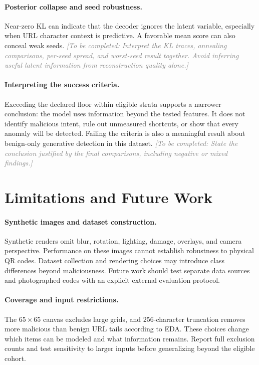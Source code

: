 \documentclass{article}
\newcommand{\pending}[1]{\textcolor{gray}{\textit{[To be completed: #1]}}}
\begin{document}
\paragraph{Posterior collapse and seed robustness.}
Near-zero KL can indicate that the decoder ignores the latent variable, especially when URL character context is predictive.
A favorable mean score can also conceal weak seeds.
\pending{Interpret the KL traces, annealing comparisons, per-seed spread, and worst-seed result together. Avoid inferring useful latent information from reconstruction quality alone.}

\paragraph{Interpreting the success criteria.}
Exceeding the declared floor within eligible strata supports a narrower conclusion: the model uses information beyond the tested features.
It does not identify malicious intent, rule out unmeasured shortcuts, or show that every anomaly will be detected.
Failing the criteria is also a meaningful result about benign-only generative detection in this dataset.
\pending{State the conclusion justified by the final comparisons, including negative or mixed findings.}

\section{Limitations and Future Work}

\paragraph{Synthetic images and dataset construction.}
Synthetic renders omit blur, rotation, lighting, damage, overlays, and camera perspective.
Performance on these images cannot establish robustness to physical QR codes.
Dataset collection and rendering choices may introduce class differences beyond maliciousness.
Future work should test separate data sources and photographed codes with an explicit external evaluation protocol.

\paragraph{Coverage and input restrictions.}
The $65\times65$ canvas excludes large grids, and 256-character truncation removes more malicious than benign URL tails according to EDA.
These choices change which items can be modeled and what information remains.
Report full exclusion counts and test sensitivity to larger inputs before generalizing beyond the eligible cohort.
\end{document}
